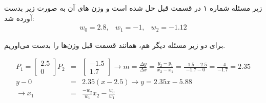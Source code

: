 زیر مسئله شماره ۱ در قسمت قبل حل شده است و وزن های آن به صورت زیر بدست آورده شد:
\begin{eqnarray*}
	w_0=2.8, &w_1=-1, &w_2=-1.12
\end{eqnarray*}

برای دو زیر مسئله دیگر هم، همانند قسمت قبل وزن‌ها را بدست می‌اوریم.

\begin{eqnarray*}
	P_1=\begin{bmatrix}
		2.5\\
		0
	\end{bmatrix}
	P_2&=&\begin{bmatrix}
		-1.5\\
		1.7
	\end{bmatrix}
	\rightarrow m=\frac{\Delta y}{\Delta x}=\frac{y_2-y_1}{x_2-x_1}=\frac{-1.5-2.5}{-1.7-0}=\frac{-4}{-1.7}=\boxed{2.35}\\
	y-0&=&2.35(x-2.5)\rightarrow \boxed{y=2.35x-5.88}\\
	\rightarrow x_1&=&\frac{-w_2}{w_1}x_2-\frac{w_0}{w_1}
\end{eqnarray*}






